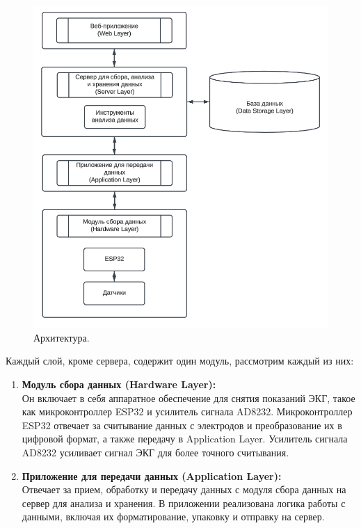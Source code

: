 \documentclass[12pt, russian]{extarticle}
\begin{document}
\begin{spacing}{1.5}
\begin{figure}[htbp]
    \centering
    \includegraphics[scale=0.85]{resources/arch_layers.png}
    \caption{Архитектура.}
    \label{fig:my_label}
\end{figure}

Каждый слой, кроме сервера, содержит один модуль, рассмотрим каждый из них:

\begin {enumerate}
    \item \textbf{Модуль сбора данных (Hardware Layer):} \\
        Он включает в себя аппаратное обеспечение для снятия показаний ЭКГ, такое как микроконтроллер ESP32 и усилитель сигнала AD8232.
        Микроконтроллер ESP32 отвечает за считывание данных с электродов и преобразование их в цифровой формат, а также передачу в Application Layer.
        Усилитель сигнала AD8232 усиливает сигнал ЭКГ для более точного считывания.

    \item \textbf{Приложение для передачи данных (Application Layer):} \\
        Отвечает за прием, обработку и передачу данных с модуля сбора данных на сервер для анализа и хранения.
        В приложении реализована логика работы с данными, включая их форматирование, упаковку и отправку на сервер.


\end{enumerate}
\end{spacing}
\end{document}
